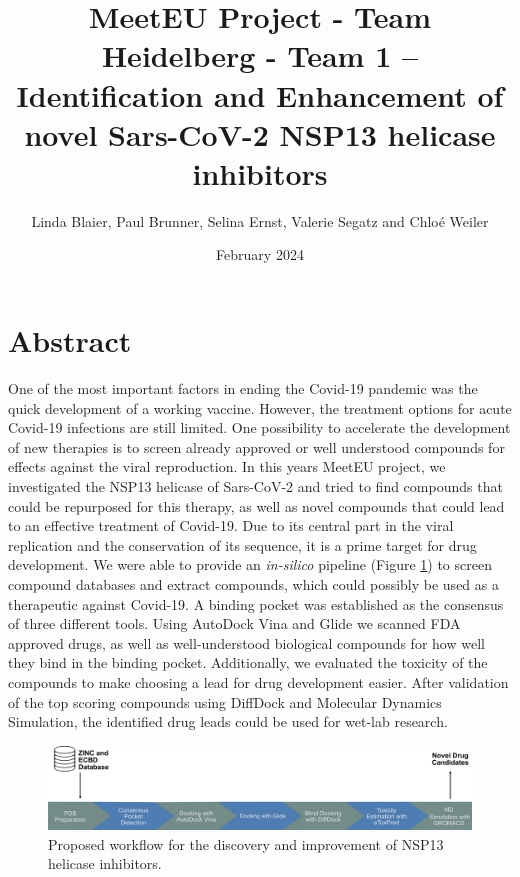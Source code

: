 \documentclass[11pt, letterpaper, titlepage]{article}
\title{MeetEU Project - Team Heidelberg - Team 1 -- \\ Identification and Enhancement of novel Sars-CoV-2 NSP13 helicase inhibitors}
\author{Linda Blaier, Paul Brunner, Selina Ernst, Valerie Segatz and Chlo\'{e} Weiler}
\date{February 2024}
\begin{document}
\maketitle

\ihead{\headmark}
\cfoot{\pagemark}   %

\section{Abstract}
One of the most important factors in ending the Covid-19 pandemic was the quick development of a working vaccine. However, the treatment options for acute Covid-19 infections are still limited. One possibility to accelerate the development of new therapies is to screen already approved or well understood compounds for effects against the viral reproduction. In this years MeetEU project, we investigated the NSP13 helicase of Sars-CoV-2 and tried to find compounds that could be repurposed for this therapy, as well as novel compounds that could lead to an effective treatment of Covid-19. Due to its central part in the viral replication and the conservation of its sequence, it is a prime target for drug development. We were able to provide an \textit{in-silico} pipeline (Figure \ref{workflow}) to screen compound databases and extract compounds, which could possibly be used as a therapeutic against Covid-19. A binding pocket was established as the consensus of three different tools. Using AutoDock Vina and Glide we scanned FDA approved drugs, as well as well-understood biological compounds for how well they bind in the binding pocket. Additionally, we evaluated the toxicity of the compounds to make choosing a lead for drug development easier. After validation of the top scoring compounds using DiffDock and Molecular Dynamics Simulation, the identified drug leads could be used for wet-lab research. 
\begin{figure}[h]
  \centering
  \includegraphics[width=\textwidth]{Workflow_MeetEU.pdf}
  \caption{Proposed workflow for the discovery and improvement of NSP13 helicase inhibitors.}
  \label{workflow}
\end{figure}
\newpage
\FloatBarrier
\end{document}
